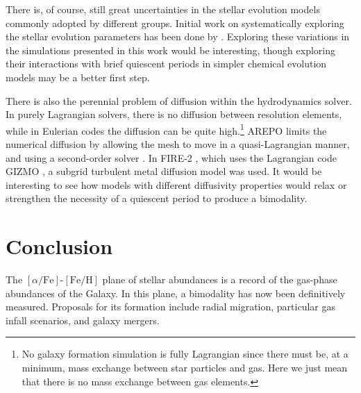 \documentclass[twocolumn,linenumbers,trackchanges]{aastex631}
\newcommand{\FeH}{\ensuremath{[\textrm{Fe}/\textrm{H}]}}
\newcommand{\alphaFe}{\ensuremath{[\alpha/\textrm{Fe}]}}
\begin{document}

There is, of course, still great uncertainties in the stellar evolution models commonly adopted by different groups. Initial work on systematically exploring the stellar evolution parameters has been done by \citet{2017A&A...605A..59R,2021MNRAS.508.3365B}. Exploring these variations in the simulations presented in this work would be interesting, though exploring their interactions with brief quiescent periods in simpler chemical evolution models may be a better first step.

There is also the perennial problem of diffusion within the hydrodynamics solver. In purely Lagrangian solvers, there is no diffusion between resolution elements, while in Eulerian codes the diffusion can be quite high.\footnote{No galaxy formation simulation is fully Lagrangian since there must be, at a minimum, mass exchange between star particles and gas. Here we just mean that there is no mass exchange between gas elements.} AREPO limits the numerical diffusion by allowing the mesh to move in a quasi-Lagrangian manner, and using a second-order solver \citep{2010MNRAS.401..791S}. In FIRE-2 \citep{2018MNRAS.480..800H}, which uses the Lagrangian code GIZMO \citep{2015MNRAS.450...53H}, a subgrid turbulent metal diffusion model was used. It would be interesting to see how models with different diffusivity properties would relax or strengthen the necessity of a quiescent period to produce a bimodality.

\section{Conclusion}\label{sec:conclusion}
The \alphaFe{}-\FeH{} plane of stellar abundances is a record of the gas-phase abundances of the Galaxy. In this plane, a bimodality has now been definitively measured. Proposals for its formation include radial migration, particular gas infall scenarios, and galaxy mergers.
\end{document}
